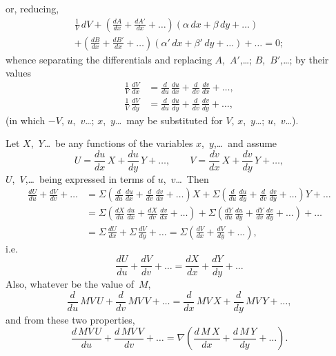 \documentclass[11pt,a4paper]{book}
\begin{document}
\newpage
or, reducing,
\begin{multline*}
\frac{1}{V}\,dV + \left(\frac{dA}{dx} + \frac{dA'}{dx} + \ldots\right)(\alpha\,dx + \beta\,dy + \ldots) \\
+ \left(\frac{dB}{dx} + \frac{dB'}{dx} + \ldots\right)(\alpha'\,dx + \beta'\,dy + \ldots) + \ldots = 0;
\end{multline*}
whence separating the differentials and replacing $A$,~$A'$,\ldots; $B$,~$B'$,\ldots; by their values
\begin{align*}
\frac{1}{V}\,\frac{dV}{dx} &= \frac{d}{du}\,\frac{du}{dx} + \frac{d}{dv}\,\frac{dv}{dx} + \ldots,\\
\frac{1}{V}\,\frac{dV}{dy} &= \frac{d}{du}\,\frac{du}{dy} + \frac{d}{dv}\,\frac{dv}{dy} + \ldots,
\end{align*}
(in which $-V$, $u$,~$v$\ldots; $x$,~$y$\ldots\ may be substituted for $V$, $x$,~$y$\ldots; $u$,~$v$\ldots).

\vspace{10pt}

 Let $X$,~$Y$\ldots\ be any functions of the variables $x$,~$y$,\ldots\ and assume
\[
U = \frac{du}{dx}\,X + \frac{du}{dy}\,Y + \ldots, \qquad
V = \frac{dv}{dx}\,X + \frac{dv}{dy}\,Y + \ldots,
\]
$U$,~$V$,\ldots\ being expressed in terms of $u$,~$v$\ldots\ Then
\begin{align*}
\frac{dU}{du} + \frac{dV}{dv} + \ldots &= \Sigma\left(\frac{d}{du}\,\frac{du}{dx} + \frac{d}{dv}\,\frac{dv}{dx} + \ldots\right)X + \Sigma\left(\frac{d}{du}\,\frac{du}{dy} + \frac{d}{dv}\,\frac{dv}{dy} + \ldots\right)Y + \ldots \\
&= \Sigma\left(\frac{dX}{du}\,\frac{du}{dx} + \frac{dX}{dv}\,\frac{dv}{dx} + \ldots\right) + \Sigma\left(\frac{dY}{du}\,\frac{du}{dy} + \frac{dY}{dv}\,\frac{dv}{dy} + \ldots\right) + \ldots \\
&= \Sigma\,\frac{dU}{dx} + \Sigma\,\frac{dV}{dy} + \ldots = \Sigma\left(\frac{dV}{dx} + \frac{dV}{dy} + \ldots\right),
\end{align*}
i.e.
\[
\frac{dU}{du} + \frac{dV}{dv} + \ldots = \frac{dX}{dx} + \frac{dY}{dy} + \ldots
\]
Also, whatever be the value of~$M$,
\[
\frac{d}{du}\,MV\,U + \frac{d}{dv}\,MV\,V + \ldots = \frac{d}{dx}\,MV\,X + \frac{d}{dy}\,MV\,Y + \ldots,
\]
and from these two properties,
\[
\frac{d\,MV\,U}{du} + \frac{d\,MV\,V}{dv} + \ldots = \nabla\left(\frac{d\,M\,X}{dx} + \frac{d\,M\,Y}{dy} + \ldots\right).
\]

\vspace{10pt}
\end{document}
